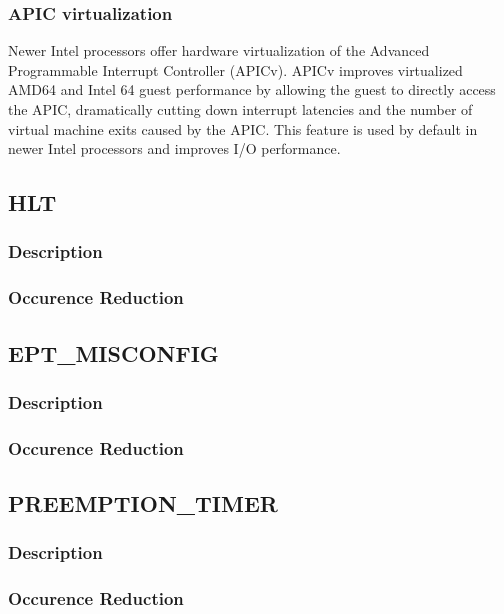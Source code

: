 \documentclass[MMR,Master,english]{twbook}
\begin{document}
\cite{lutsykPipelinedMulticoreMachine2020}

\subsubsection{APIC virtualization}


Newer Intel processors offer hardware virtualization of the Advanced Programmable Interrupt Controller (APICv). APICv improves virtualized AMD64 and Intel 64 guest performance by allowing the guest to directly access the APIC, dramatically cutting down interrupt latencies and the number of virtual machine exits caused by the APIC. This feature is used by default in newer Intel processors and improves I/O performance.





\clearpage
\subsection{HLT}
\subsubsection{Description}
\subsubsection{Occurence Reduction}
\clearpage
\subsection{EPT\_MISCONFIG}
\subsubsection{Description}
\subsubsection{Occurence Reduction}
\clearpage
\subsection{PREEMPTION\_TIMER}
\subsubsection{Description}
\subsubsection{Occurence Reduction}
\clearpage
\end{document}
